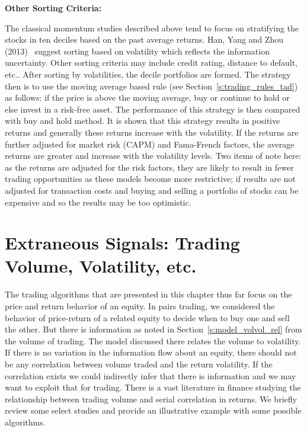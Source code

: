 \noindent \textbf{Other Sorting Criteria:} \twomedskip


The classical momentum studies described above tend to focus on stratifying the stocks in ten deciles based on the past average returns. Han, Yang and Zhou (2013)~\cite{hanyangzhou} suggest sorting based on volatility which reflects the information uncertainty. Other sorting criteria may include credit rating, distance to default, etc.. After sorting by volatilities, the decile portfolios are formed. The strategy then is to use the moving average based rule (see Section~\ref{s:trading_rules_tad}) as follows: if the price is above the moving average, buy or continue to hold or else invest in a risk-free asset. The performance of this strategy is then compared with buy and hold method. It is shown that this strategy results in positive returns and generally these returns increase with the volatility. If the returns are further adjusted for market risk (CAPM) and Fama-French factors, the average returns are greater and increase with the volatility levels. Two items of note here: as the returns are adjusted for the risk factors, they are likely to result in fewer trading opportunities as these models become more restrictive; if results are not adjusted for transaction costs and buying and selling a portfolio of stocks can be expensive and so the results may be too optimistic.  



\section{Extraneous Signals: Trading Volume, Volatility, etc.}

The trading algorithms that are presented in this chapter thus far focus on the price and return behavior of an equity. In pairs trading, we considered the behavior of price-return of a related equity to decide when to buy one and sell the other. But there is information as noted in Section~\ref{s:model_volvol_rel} from the volume of trading. The model discussed there relates the volume to volatility. If there is no variation in the information flow about an equity, there should not be any correlation between volume traded and the return volatility. If the correlation exists we could indirectly infer that there is information and we may want to exploit that for trading. There is a vast literature in finance studying the relationship between trading volume and serial correlation in returns. We briefly review some select studies and provide an illustrative example with some possible algorithms. 


